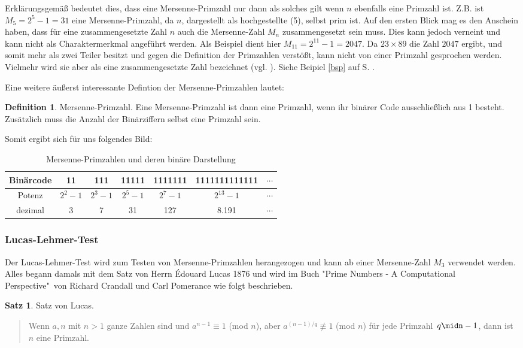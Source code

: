 \documentclass[12pt,a4paper]{article}
\theoremstyle{definition}
\newtheorem{defi}{Definition}[section]
\newtheorem{satz}{Satz}[subsection]
\begin{document}
Erklärungsgemäß bedeutet dies, dass eine Mersenne-Primzahl nur dann als solches gilt wenn $n$ ebenfalls eine Primzahl ist.
Z.B. ist $M_5 = 2^{5}-1 = 31$ eine Mersenne-Primzahl, da $n$, dargestellt als hochgestellte (5), selbst prim ist.
Auf den ersten Blick mag es den Anschein haben, dass für eine zusammengesetzte Zahl $n$ auch die Mersenne-Zahl $M_n$ zusammengesetzt sein muss.
Dies kann jedoch verneint und kann nicht als Charaktermerkmal angeführt werden. Als Beispiel dient hier $M_{11} = 2^{11}-1 = 2047$.
Da $23 \times 89$ die Zahl $2047$ ergibt, und somit mehr als zwei Teiler besitzt und gegen die Definition der Primzahlen verstößt, kann nicht von einer Primzahl gesprochen werden.
Vielmehr wird sie aber als eine zusammengesetzte Zahl bezeichnet (vgl. \cite[168--169]{RempeGillen2009}).
Siehe Beipiel \ref{bsp} auf S. \pageref{bsp}.

Eine weitere äußerst interessante Defintion der Mersenne-Primzahlen lautet:
\begin{defi}{Mersenne-Primzahl}.\newline
Eine Mersenne-Primzahl ist dann eine Primzahl, wenn ihr binärer Code ausschließlich aus 1 besteht.\newline
Zusätzlich muss die Anzahl der Binärziffern selbst eine Primzahl sein.
\end{defi}

Somit ergibt sich für uns folgendes Bild:
\begin{table}[h]\begin{center}
\begin{tabular}{c|c|c|c|c|c|c}
Binärcode & 11 & 111 & 11111 & 1111111 & 1111111111111 & $\cdots$ \\
\hline
Potenz & $2^2-1$ & $2^3-1$ & $2^5-1$ & $2^7-1$ & $2^{13}-1$ & $\cdots$ \\
\hline
dezimal & 3 & 7 & 31 & 127 & 8.191 & $\cdots$
\end{tabular}\end{center}
\caption{Mersenne-Primzahlen und deren binäre Darstellung}
\label{tab:Mersenne-Primzahlen und deren binäre Darstellung}
\end{table}

\subsubsection{Lucas-Lehmer-Test}\label{Lucas-Lehmer-Test}
Der Lucas-Lehmer-Test wird zum Testen von Mersenne-Primzahlen herangezogen und kann ab einer Mersenne-Zahl $M_3$ verwendet werden.
Alles begann damals mit dem Satz von Herrn Édouard Lucas 1876 und wird im Buch "Prime Numbers - A Computational Perspective"\ von Richard Crandall und Carl Pomerance wie folgt beschrieben.
\begin{satz}{Satz von Lucas}.
\begin{quote}
\small
Wenn $a, n$ mit $n > 1$ ganze Zahlen sind und\newline
$a^{n-1} \equiv 1$ (mod $n$), aber $a^{(n-1)/q} \not\equiv 1$ (mod $n$) für jede Primzahl $q\midn-1$,\newline
dann ist $n$ eine Primzahl.\newline
\autocite[173]{Crandall2005}
\end{quote}
\end{satz}
\end{document}
